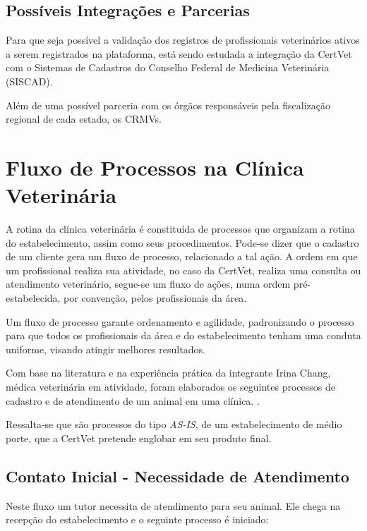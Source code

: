 \documentclass[
    12pt,               %
    openright,          %
    oneside,
    a4paper,            %
    BIBLATEX,           %
    TODO,               %
    english,            %
    brazil              %
    ]{ifsp-spo-inf-ctds}
\begin{document}
        \subsection{Possíveis Integrações e Parcerias}
        
            Para que seja possível a validação dos registros de profissionais veterinários ativos a serem registrados na plataforma, está sendo estudada a integração da CertVet com o Sistemas de Cadastros do Conselho Federal de Medicina Veterinária (SISCAD).
        
            Além de uma possível parceria com os órgãos responsáveis pela fiscalização regional de cada estado, os CRMVs.

    \section{Fluxo de Processos na Clínica Veterinária}

    A rotina da clínica veterinária é constituída de processos que organizam a rotina do estabelecimento, assim como seus procedimentos. Pode-se dizer que o cadastro de um cliente gera um fluxo de processo, relacionado a tal ação. A ordem em que um profissional realiza sua atividade, no caso da CertVet, realiza uma consulta ou atendimento veterinário, segue-se um fluxo de ações, numa ordem pré-estabelecida, por convenção, pelos profissionais da área. 

    Um fluxo de processo garante ordenamento e agilidade, padronizando o processo para que todos os profissionais da área e do estabelecimento tenham uma conduta uniforme, visando atingir melhores resultados.

    Com base na literatura e na experiência prática da integrante Irina Chang, médica veterinária em atividade, foram elaborados os seguintes processos de cadastro e de atendimento de um animal em uma clínica. .

    Ressalta-se que são processos do tipo \emph{AS-IS}, de um estabelecimento de médio porte, que a CertVet pretende englobar em seu produto final.

    \subsection{Contato Inicial - Necessidade de Atendimento}
    
     Neste fluxo um tutor necessita de atendimento para seu animal. Ele chega na recepção do estabelecimento e o seguinte processo é iniciado:
     
\end{document}
